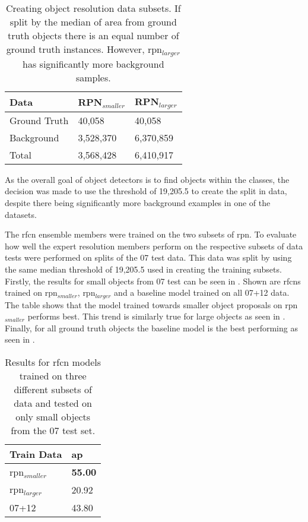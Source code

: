 \documentclass[a4paper,twoside]{article}
\begin{document}
\begin{table}[h]
\centering
\caption{Creating object resolution data subsets. If split by the median of area from ground truth objects there is an equal number of ground truth instances. However, \gls{rpn}$_{larger}$ has significantly more background samples.}
\label{tab:splitgt}
\begin{tabular}{|l|l|l|}
\hline
\textbf{Data} & \textbf{RPN$_{smaller}$} & \textbf{RPN$_{larger}$} \\ \hline
Ground Truth & 40,058    & 40,058     \\ 
Background   & 3,528,370 & 6,370,859  \\ \hline
Total        & 3,568,428 & 6,410,917  \\ \hline
\end{tabular}
\end{table}

As the overall goal of object detectors is to find objects within the classes, the decision was made to use the threshold of 19,205.5 to create the split in data, despite there being significantly more background examples in one of the datasets.

The \gls{rfcn} ensemble members were trained on the two subsets of \gls{rpn}. To evaluate how well the expert resolution members perform on the respective subsets of data tests were performed on splits of the 07 test data. This data was split by using the same median threshold of 19,205.5 used in creating the training subsets. Firstly, the results for small objects from 07 test can be seen in . Shown are \glspl{rfcn} trained on \gls{rpn}$_{smaller}$, \gls{rpn}$_{larger}$ and a baseline model trained on all 07+12 data. The table shows that the model trained towards smaller object proposals on \gls{rpn}$_{smaller}$ performs best. This trend is similarly true for large objects as seen in . Finally, for all ground truth objects the baseline model is the best performing as seen in .

\begin{table}[h]
\centering
\caption{Results for \gls{rfcn} models trained on three different subsets of data and tested on only small objects from the 07 test set.}
\label{tab:small07res}
\begin{tabular}{|l|l|}
\hline
\textbf{Train Data} & \textbf{\gls{ap}}      \\ \hline
\gls{rpn}$_{smaller}$      & \textbf{55.00} \\ \hline
\gls{rpn}$_{larger}$      & 20.92 \\ \hline
07+12        & 43.80 \\ \hline
\end{tabular}
\end{table}
\end{document}
